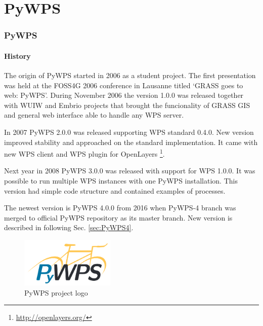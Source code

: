 \newpage
\part{PyWPS}

\newpage
\section{PyWPS}
\label{sec:PyWPS}
\subsection{History}
The origin of PyWPS started in 2006 as a student project. The first presentation was held at the FOSS4G 2006 conference in Lausanne titled 
‘GRASS goes to web: PyWPS’. During November 2006 the version 1.0.0 was released together with WUIW and Embrio projects that brought the
funcionality of GRASS GIS and general web interface able to handle any WPS server.\cite{PyWPS_presentation}\cite{PyWPS_web}

In 2007 PyWPS 2.0.0 was released supporting WPS standard 0.4.0. New
version improved stability and approached on the standard
implementation. It came with new WPS client and WPS plugin for
OpenLayers \footnote{\url{http://openlayers.org/}}.

Next year in 2008 PyWPS 3.0.0 was released with support for WPS 1.0.0. It was possible to run multiple WPS instances
with one PyWPS installation. This version had simple code structure and contained examples of processes. 

The newest version is PyWPS 4.0.0 from 2016 when PyWPS-4 branch was merged to official PyWPS repository as its master branch.
 New version is described in following Sec. \ref{sec:PyWPS4}.

\begin{figure}[h!]
\centering
\includegraphics[width=0.4\textwidth]{img/pywps_logo.png}
\caption{PyWPS project logo}
\label{fig:pywps_logo}
\end{figure}

